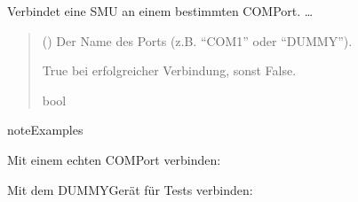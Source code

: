 \documentclass[letterpaper,10pt,english]{sphinxmanual}
\begin{document}
\begin{fulllineitems}

\begin{fulllineitems}
\label{\detokenize{modulab/smu_manager:modules.smu.SmuManager.SmuManager.connect}}
\pysigstartsignatures
\pysiglinewithargsret
{}
{}
{}
\pysigstopsignatures
\sphinxAtStartPar
Verbindet eine SMU an einem bestimmten COM\sphinxhyphen{}Port.
…
\begin{quote}\begin{description}
\sphinxAtStartPar
{} () \textendash{} Der Name des Ports (z.B. “COM1” oder “DUMMY”).

\sphinxAtStartPar
True bei erfolgreicher Verbindung, sonst False.

\sphinxAtStartPar
bool

\end{description}\end{quote}

\begin{sphinxadmonition}{note}{Examples}

\sphinxAtStartPar
Mit einem echten COM\sphinxhyphen{}Port verbinden:

\begin{sphinxVerbatim}[commandchars=\\\{\}]
  
 
\end{sphinxVerbatim}

\sphinxAtStartPar
Mit dem DUMMY\sphinxhyphen{}Gerät für Tests verbinden:

\begin{sphinxVerbatim}[commandchars=\\\{\}]
\end{sphinxVerbatim}
\end{sphinxadmonition}


\end{fulllineitems}
\end{fulllineitems}
\end{document}
